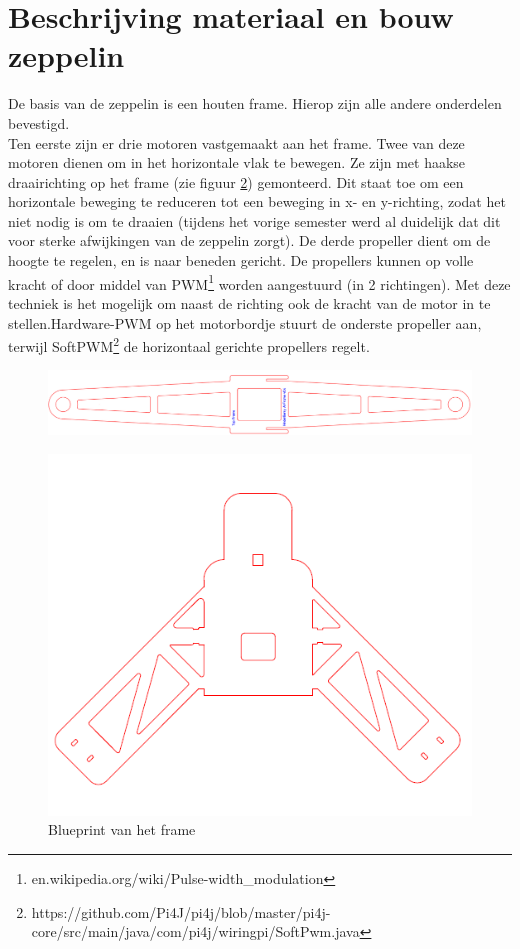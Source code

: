 \documentclass[eind]{penoverslag}
\begin{document}
\section{Beschrijving materiaal en bouw zeppelin}
De basis van de zeppelin is een houten frame. Hierop zijn alle andere onderdelen bevestigd.\\
Ten eerste zijn er drie motoren vastgemaakt aan het frame. Twee van deze motoren dienen om in het horizontale vlak te bewegen. Ze zijn met haakse draairichting op het frame (zie figuur \ref{frame}) gemonteerd. Dit staat toe om een horizontale beweging te reduceren tot een beweging in x- en y-richting, zodat het niet nodig is om te draaien (tijdens het vorige semester werd al duidelijk dat dit voor sterke afwijkingen van de zeppelin zorgt). De derde propeller dient om de hoogte te regelen, en is naar beneden gericht. De propellers kunnen op volle kracht of door middel van PWM\footnote{en.wikipedia.org/wiki/Pulse-width\_modulation} worden aangestuurd (in 2 richtingen). Met deze techniek is het mogelijk om naast de richting ook de kracht van de motor in te stellen.Hardware-PWM op het motorbordje stuurt de onderste propeller aan, terwijl SoftPWM\footnote{https://github.com/Pi4J/pi4j/blob/master/pi4j-core/src/main/java/com/pi4j/wiringpi/SoftPwm.java} de horizontaal gerichte propellers regelt. 

\begin{figure}[h!]
\centering
\includegraphics[scale=0.3]{upperFrame.png}
\label{frame}
\end{figure}

\begin{figure}[h!]
\centering
\includegraphics[scale=0.4]{lowerFrame.png}
\caption{Blueprint van het frame}
\label{frame}
\end{figure}
\end{document}
